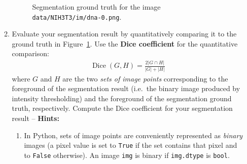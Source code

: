 \documentclass[12pt,a4paper]{article}
\begin{document}
\begin{enumerate}
\begin{enumerate}
\begin{figure}[h!]
            \caption{Segmentation ground truth for the image \texttt{data/NIH3T3/im/dna-0.png}.}
            \label{fig:nih3t3-im00-bingt}
        \end{figure}
        
        \item Evaluate your segmentation result by quantitatively comparing it to the ground truth in Figure~\ref{fig:nih3t3-im00-bingt}. Use the \textbf{Dice coefficient} for the quantitative comparison:
        \begin{gather*}
            \operatorname{Dice}\left(G, H\right) = \frac{2 \left| G \cap H \right|}{ \left|G\right| + \left|H\right|}
        \end{gather*}
        where $G$ and $H$ are the two \emph{sets of image points} corresponding to the foreground of the segmentation result (i.e.\ the binary image produced by intensity thresholding) and the foreground of the segmentation ground truth, respectively. Compute the Dice coefficient for your segmentation result -- \textbf{Hints:}
        \begin{enumerate}
            \item In Python, sets of image points are conveniently represented as \emph{binary} images (a pixel value is set to \texttt{True} if the set contains that pixel and to \texttt{False} otherwise). An image \texttt{img} is binary if \texttt{img.dtype} is \texttt{bool}.

\end{enumerate}
\end{enumerate}
\end{enumerate}
\end{document}
